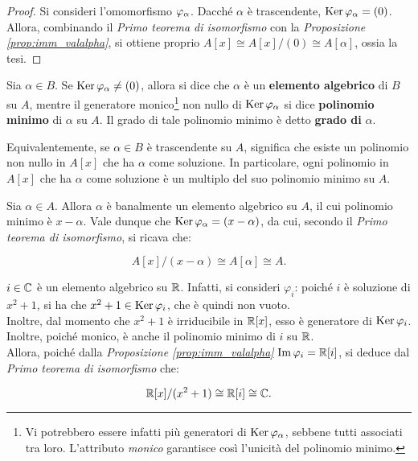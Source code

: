 \documentclass[11pt]{scrbook}
\begin{document}
\begin{proof}
    Si consideri l'omomorfismo $\varphi_\alpha$. Dacché $\alpha$ è
    trascendente, $\operatorname{Ker} \varphi_\alpha  = (0)$. Allora, combinando
    il \textit{Primo teorema di isomorfismo} con la
    \textit{Proposizione \ref{prop:imm_valalpha}}, si ottiene
    proprio $A[x] \cong A[x]/(0) \cong A[\alpha]$, ossia la tesi.
\end{proof}

\begin{definition}
    Sia $\alpha \in B$. Se $\operatorname{Ker} \varphi_\alpha \neq (0)$, allora si
    dice che $\alpha$ è un \textbf{elemento algebrico} di
    $B$ su $A$, mentre il generatore monico\footnote{Vi potrebbero
        essere infatti più generatori di $\operatorname{Ker} \varphi_\alpha$, sebbene
        tutti associati tra loro. L'attributo \textit{monico} garantisce
        così l'unicità del polinomio minimo.} non nullo di $\operatorname{Ker} \varphi_\alpha$ si
    dice \textbf{polinomio minimo} di $\alpha$ su $A$. Il grado
    di tale polinomio minimo è detto \textbf{grado di} $\alpha$.
\end{definition}

\begin{remark*}
    Equivalentemente, se $\alpha \in B$ è trascendente su $A$,
    significa che esiste un polinomio non nullo in $A[x]$ che ha $\alpha$ come
    soluzione. In particolare, ogni polinomio in $A[x]$ che ha
    $\alpha$ come soluzione è un multiplo del suo polinomio
    minimo su $A$.
\end{remark*}

\begin{example}
    Sia $\alpha \in A$. Allora $\alpha$ è banalmente un elemento
    algebrico su $A$, il cui polinomio minimo è $x-\alpha$. Vale
    dunque che $\operatorname{Ker} \varphi_\alpha = (x-\alpha)$, da cui, secondo
    il \textit{Primo teorema di isomorfismo}, si ricava che:

    \[ A[x]/(x-\alpha) \cong A[\alpha] \cong A. \]
\end{example}

\begin{example}
    $i \in \mathbb C$ è un elemento algebrico su $\mathbb R$. Infatti, si
    consideri $\varphi_i$: poiché $i$ è soluzione di $x^2+1$,
    si ha che $x^2+1 \in \operatorname{Ker} \varphi_i$, che è quindi non vuoto. \\

    Inoltre, dal momento che $x^2+1$ è irriducibile in $\mathbb R[x]$,
    esso è generatore di
    $\operatorname{Ker} \varphi_i$. Inoltre, poiché monico, è anche il
    polinomio minimo di $i$ su $\mathbb R$. \\

    Allora, poiché dalla \textit{Proposizione
        \ref{prop:imm_valalpha}} $\operatorname{Im} \varphi_i = \mathbb R[i]$, si deduce dal \textit{Primo teorema di isomorfismo} che:

    \[ \mathbb{R}[x]/(x^2+1) \cong \mathbb R[i] \cong \mathbb C. \]
\end{example}
\end{document}
